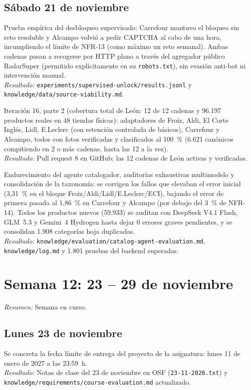 \documentclass[11pt,a4paper]{article}
\newcommand{\actividad}[3]{\item[\textbf{[#1]}] #2 \\ \textit{Resultado:} #3}
\begin{document}
	\subsection*{Sábado 21 de noviembre}
	\begin{description}[leftmargin=0pt, itemsep=6pt]
		\actividad{Análisis}{Prueba empírica del desbloqueo supervisado: Carrefour mantuvo el bloqueo sin reto resoluble y Alcampo volvió a pedir CAPTCHA al cabo de una hora, incumpliendo el límite de NFR-13 (como máximo un reto semanal). Ambas cadenas pasan a recogerse por HTTP plano a través del agregador público RadarSuper (permitido explícitamente en su \texttt{robots.txt}), sin evasión anti-bot ni intervención manual.}{\texttt{experiments/supervised-unlock/results.jsonl} y \texttt{knowledge/data/source-viability.md}.}
		\actividad{Tarea}{Iteración 16, parte 2 (cobertura total de León: 12 de 12 cadenas y 96.197 productos reales en 48 tiendas físicas): adaptadores de Froiz, Aldi, El Corte Inglés, Lidl, E.Leclerc (con retención controlada de básicos), Carrefour y Alcampo, todos con fotos verificadas y clasificados al 100~\% (6.621 canónicos compitiendo en 2 o más cadenas, hasta las 12 a la vez).}{Pull request 8 en GitHub; las 12 cadenas de León activas y verificadas.}
		\actividad{Tarea}{Endurecimiento del agente catalogador, auditorías exhaustivas multimodelo y consolidación de la taxonomía: se corrigen los fallos que elevaban el error inicial (3,31~\% en el bloque Froiz/Aldi/Lidl/E.Leclerc/ECI), bajando el error de primera pasada al 1,86~\% en Carrefour y Alcampo (por debajo del 3~\% de NFR-14). Todos los productos nuevos (59.933) se auditan con DeepSeek V4.1 Flash, GLM~5.3 y Gemini~4 Hydrogen hasta dejar 0 errores graves pendientes, y se consolidan 1.908 categorías hoja duplicadas.}{\texttt{knowledge/evaluation/catalog-agent-evaluation.md}, \texttt{knowledge/log.md} y 1.801 pruebas del backend superadas.}
	\end{description}

	\section*{Semana 12: 23 -- 29 de noviembre}
	\textit{Resumen:} Semana en curso.

	\subsection*{Lunes 23 de noviembre}
	\begin{description}[leftmargin=0pt, itemsep=6pt]
		\actividad{Clase}{Se concreta la fecha límite de entrega del proyecto de la asignatura: lunes 11 de enero de 2027 a las 23:59~h.}{Notas de clase del 23 de noviembre en OSF (\texttt{23-11-2026.txt}) y \texttt{knowledge/requirements/course-evaluation.md} actualizado.}
	\end{description}
\end{document}
